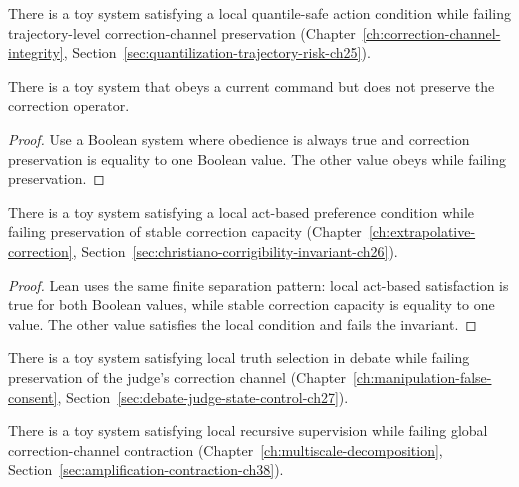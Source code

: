 \begin{theorem}
\label{appi:thm:quantilization-not-trajectory-cci}
There is a toy system satisfying a local quantile-safe action condition while failing trajectory-level correction-channel preservation (Chapter~\ref{ch:correction-channel-integrity}, Section~\ref{sec:quantilization-trajectory-risk-ch25}).
\end{theorem}

\begin{theorem}
\label{appi:thm:p25}
There is a toy system that obeys a current command but does not preserve the correction operator.
\end{theorem}
\begin{proof}
Use a Boolean system where obedience is always true and correction preservation is equality to one Boolean value. The other value obeys while failing preservation.
\end{proof}

\begin{theorem}
\label{appi:thm:act-based-not-stable-corrigibility}
There is a toy system satisfying a local act-based preference condition while failing preservation of stable correction capacity (Chapter~\ref{ch:extrapolative-correction}, Section~\ref{sec:christiano-corrigibility-invariant-ch26}).
\end{theorem}
\begin{proof}
Lean uses the same finite separation pattern: local act-based satisfaction is true for both Boolean values, while stable correction capacity is equality to one value. The other value satisfies the local condition and fails the invariant.
\end{proof}

\begin{theorem}
\label{appi:thm:debate-truth-not-correction}
There is a toy system satisfying local truth selection in debate while failing preservation of the judge's correction channel (Chapter~\ref{ch:manipulation-false-consent}, Section~\ref{sec:debate-judge-state-control-ch27}).
\end{theorem}

\begin{theorem}
\label{appi:thm:amplification-not-contraction}
There is a toy system satisfying local recursive supervision while failing global correction-channel contraction (Chapter~\ref{ch:multiscale-decomposition}, Section~\ref{sec:amplification-contraction-ch38}).
\end{theorem}


